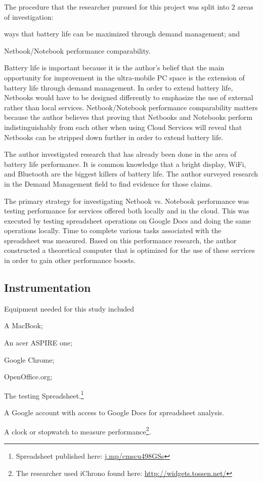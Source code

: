 The procedure that the researcher pursued for this project was split into 2
areas of investigation:
\begin{inparaenum}[(1)]
\item ways that battery life can be maximized through demand management; and
\item Netbook/Notebook performance comparability.
\end{inparaenum}
Battery life is important because it is the author's belief that the main
opportunity for improvement in the ultra-mobile PC space is the extension of
battery life through demand management.  In order to extend battery life,
Netbooks would have to be designed differently to emphasize the use of external
rather than local services.  Netbook/Notebook performance comparability matters
because the author believes that proving that Netbooks and Notebooks perform
indistinguishably from each other when using Cloud Services will reveal that
Netbooks can be stripped down further in order to extend battery life.

The author investigated research that has already been done in the area of
battery life performance.  It is common knowledge that a bright display, WiFi,
and Bluetooth are the biggest killers of battery life.  The author surveyed
research in the Demand Management field to find evidence for those claims.

The primary strategy for investigating Netbook vs. Notebook performance was
testing performance for services offered both locally and in the cloud.  This
was executed by testing spreadsheet operations on Google Docs and doing the same
operations locally.  Time to complete various tasks associated with the
spreadsheet was measured.  Based on this performance research, the author
constructed a theoretical computer that is optimized for the use of these
services in order to gain other performance boosts.

\subsection{Instrumentation}

Equipment needed for this study included
\begin{inparaenum}[(1)]
\item A MacBook;
\item An acer ASPIRE one;
\item Google Chrome;
\item OpenOffice.org;
\item The testing Spreadsheet.\footnote{Spreadsheet published here:
  \url{j.mp/cmscu498GSs}}
\item A Google account with access to Google Docs for spreadsheet analysis.
\item A clock or stopwatch to measure performance\footnote{The researcher used
  iChrono found here: \url{http://widgets.tossen.net/}}.
\end{inparaenum}

